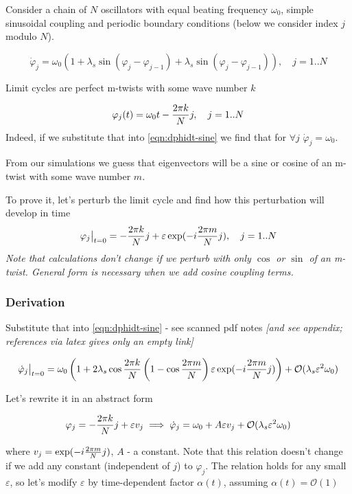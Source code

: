 \documentclass[a4paper,12pt]{article}
\newcommand{\eps}{\varepsilon}
\newcommand{\bigO}{\mathcal{O}}
\begin{document}
Consider a chain of $N$ oscillators with equal beating frequency $\omega_0$, simple sinusoidal coupling and periodic boundary conditions (below we consider index $j$ modulo $N$).

\begin{equation}
\dot \varphi_j = \omega_0 ( 1 + \lambda_s \sin(\varphi_j - \varphi_{j-1})
+ \lambda_s \sin(\varphi_j - \varphi_{j-1})), \quad j=1..N
\label{eqn:dphidt-sine}
\end{equation}

Limit cycles are perfect m-twists with some wave number $k$

$$
\varphi_j(t) = \omega_0 t - \frac{2 \pi k} {N} j, \quad j=1..N
$$
Indeed, if we substitute that into \eqref{eqn:dphidt-sine} we find that for  $\forall j$ $\dot \varphi_j = \omega_0$.

From our simulations we guess that eigenvectors will be a sine or cosine of an m-twist with some wave number $m$.

To prove it, let's perturb the limit cycle and find how this perturbation will develop in time
$$
\varphi_j \big\rvert_{t=0} = - \fr{k}{j} + \eps \exp( - i \fr{m}{j}), \quad j=1..N
$$
\textit{
Note that calculations don't change if we perturb with only $\cos$ or $\sin$ of an m-twist. General form is necessary when we add cosine coupling terms.
}

\subsubsection{Derivation}

Substitute that into \eqref{eqn:dphidt-sine} - see scanned pdf notes \textit{[and see appendix; references via latex gives only an empty link]}

\begin{equation}
\dot \varphi_j \big\rvert_{t=0} = 
\omega_0 \left( 1 +  2 \lambda_s  \co{k}{} \left(1 - \co{m}{} \right) \eps \exp( - i \fr{m}{j}) \right)  
+ \bigO(\lambda_s \eps ^2 \omega_0)
\end{equation}

Let's rewrite it in an abstract form

\begin{equation}
 \varphi_j = -  \fr{k}{j}  + \eps  v_j \implies 
\dot \varphi_j =  \omega_0 + A \eps  v_j + \bigO(\lambda_s \eps ^2 \omega_0)
\label{eqn:dphidt-sin-abstract}
\end{equation}

where $v_j =\exp( - i \frac{2 \pi m} {N} j)$, $A$ - a constant. Note that this relation doesn't change if we add any constant (independent of $j$) to $\varphi_j$. The relation holds for any small $\eps$, so let's modify $\eps$ by time-dependent factor $\alpha(t)$, assuming $\alpha(t) = \bigO(1)$
\end{document}
